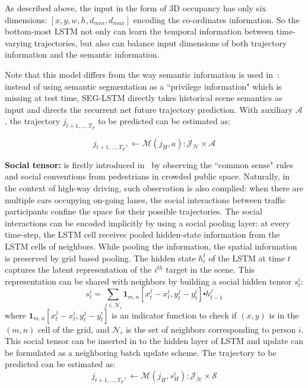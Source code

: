 \documentclass[10pt,twocolumn,letterpaper]{article}
\begin{document}
 As described above, the input in the form of 3D occupancy has only six dimensions: $[x, y, w, h, d_{min}, d_{max}]$ encoding the co-ordinates information. So the bottom-most LSTM not only can learn the temporal information between time-varying trajectories,  but also can balance input dimensions of both trajectory information and the semantic information.

Note that this model differs from the way semantic information is used in~\cite{xu2017end}: instead of using semantic segmentation as a ``privilege information" which is missing at test time, SEG-LSTM directly takes historical scene semantics as input and directs the recurrent net future trajectory prediction. With auxiliary $\mathcal{A}$, the trajectory  $j_{t+1, \ldots, T_F}$  to be predicted can be estimated as:

\begin{equation}
j_{t+1, \ldots, T_F}, \leftarrow  \bm{\mathcal{M}}(j_H, a): \mathcal{J_H} \times \mathcal{A}
\label{eq:SEG-LSTM}
\end{equation}


\vspace{\baselineskip}
\noindent \textbf{Social tensor:} is firstly introduced in~\cite{alahi2016social} by observing the ``common sense" rules and social conventions from pedestrians in crowded public space. Naturally, in the context of high-way driving, such observation is also complied: when there are multiple cars occupying on-going lanes, the social interactions between traffic participants confine the space for their possible trajectories. The social interactions can be encoded implicitly by using a social pooling layer: at every time-step, the LSTM cell receives pooled hidden-state information from the LSTM cells of neighbors. While pooling the information, the spatial information is preserved by grid based pooling. The hidden state $h^t_i$ of the LSTM at time $t$ captures the latent representation of the $i^{th}$ target in the scene. This representation can be shared with neighbors by building a social hidden tensor $s^i_t$:
\begin{equation}
s^i_t = \sum_{j \in \mathcal{N}_i} \mathbf{1}_{m,n} [x^j_t - x^i_t, y^j_t - y^i_t] \centerdot  h^j_{t-1}
\label{eq:social_tensor}
\end{equation}
where $\mathbf{1}_{m,n} [x^j_t - x^i_t, y^j_t - y^i_t]$ is an indicator function to check if $(x, y)$ is in the $(m, n)$ cell of the grid, and $\mathcal{N}_i$ is the set of neighbors corresponding to person $i$. This social tensor can be inserted in to the hidden layer of LSTM and update can be formulated as a neighboring batch update scheme. 
The trajectory  to be predicted can be estimated as:
\begin{equation}
j_{t+1, \ldots, T_F}, \leftarrow  \bm{\mathcal{M}}(j_H, s^i_H): \mathcal{J_H}  \times \mathcal{S}
\label{eq:FtS}
\end{equation}
\end{document}
